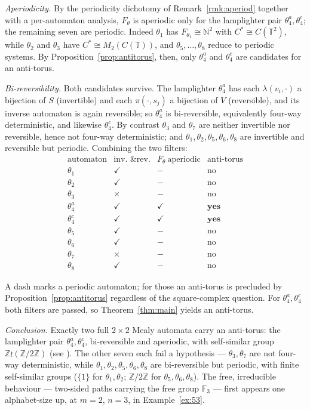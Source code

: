 \documentclass[11pt,reqno]{amsart}
\theoremstyle{plain}
\theoremstyle{definition}
\newcommand{\NN}{\mathbb{N}}
\newcommand{\ZZ}{\mathbb{Z}}
\begin{document}
\emph{Aperiodicity.} By the periodicity dichotomy of Remark~\ref{rmk:aperiod}
together with a per-automaton analysis, $F_\theta$ is aperiodic only for the
lamplighter pair $\theta_4^a,\theta_4^c$; the remaining seven are periodic. Indeed
$\theta_1$ has $F_{\theta_1}\cong\NN^2$ with $C^*\cong C(\mathbb T^2)$, while
$\theta_2$ and $\theta_3$ have $C^*\cong M_2(C(\mathbb T))$, and
$\theta_5,\dots,\theta_8$ reduce to periodic systems. By
Proposition~\ref{prop:antitorus}, then, only $\theta_4^a$ and $\theta_4^c$ are
candidates for an anti-torus.

\emph{Bi-reversibility.} Both candidates survive. The lamplighter
$\theta_4^a$ has each $\lambda(v_i,\cdot)$ a bijection of $S$ (invertible) and each
$\pi(\cdot,s_j)$ a bijection of $V$ (reversible), and its inverse automaton is again
reversible; so $\theta_4^a$ is bi-reversible, equivalently four-way deterministic,
and likewise $\theta_4^c$. By contrast $\theta_3$ and $\theta_7$ are neither
invertible nor reversible, hence not four-way
deterministic; and $\theta_1,\theta_2,\theta_5,\theta_6,\theta_8$ are invertible and
reversible but periodic. Combining the two filters:
\[
\renewcommand{\arraystretch}{1.2}
\begin{array}{l|ccc}
\text{automaton} & \text{inv.\ \& rev.} & F_\theta\ \text{aperiodic} &
  \text{anti-torus}\\\hline
\theta_1 & \checkmark & - & \text{no}\\
\theta_2 & \checkmark & - & \text{no}\\
\theta_3 & \times & - & \text{no}\\
\theta_4^a & \checkmark & \checkmark & \textbf{yes}\\
\theta_4^c & \checkmark & \checkmark & \textbf{yes}\\
\theta_5 & \checkmark & - & \text{no}\\
\theta_6 & \checkmark & - & \text{no}\\
\theta_7 & \times & - & \text{no}\\
\theta_8 & \checkmark & - & \text{no}
\end{array}
\]

\noindent
A dash marks a periodic automaton; for those an anti-torus is precluded by
Proposition~\ref{prop:antitorus} regardless of the square-complex question. For
$\theta_4^a,\theta_4^c$ both filters are passed, so Theorem~\ref{thm:main} yields an
anti-torus.

\emph{Conclusion.} Exactly two full $2\times2$ Mealy automata carry an anti-torus:
the lamplighter pair $\theta_4^a,\theta_4^c$, bi-reversible and aperiodic, with
self-similar group $\ZZ\wr(\ZZ/2\ZZ)$ (see \cite{GNS}). The other seven each fail a hypothesis ---
$\theta_3,\theta_7$ are not four-way deterministic, while
$\theta_1,\theta_2,\theta_5,\theta_6,\theta_8$ are bi-reversible but periodic, with
finite self-similar groups ($\{1\}$ for $\theta_1,\theta_2$; $\ZZ/2\ZZ$ for
$\theta_5,\theta_6,\theta_8$). The free, irreducible behaviour --- two-sided paths
carrying the free group $\mathbb{F}_3$ --- first appears one alphabet-size up, at
$m=2$, $n=3$, in Example~\ref{ex:53}.
\end{document}
